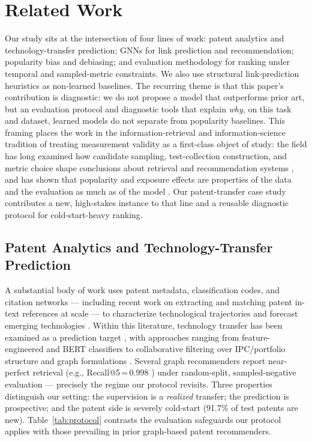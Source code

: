 \documentclass[preprint,12pt]{elsarticle}
\begin{document}
\section{Related Work}
\label{sec:related}

Our study sits at the intersection of four lines of work: patent analytics and
technology-transfer prediction; GNNs for link prediction and recommendation;
popularity bias and debiasing; and evaluation methodology for ranking under temporal
and sampled-metric constraints. We also use structural link-prediction heuristics as
non-learned baselines. The recurring theme is that this paper's contribution is diagnostic:
we do not propose a model that outperforms prior art, but an evaluation protocol and
diagnostic tools that explain \emph{why}, on this task and dataset, learned models do
not separate from popularity baselines. This framing places the work in the
information-retrieval and information-science tradition of treating measurement
validity as a first-class object of study: the field has long examined how candidate
sampling, test-collection construction, and metric choice shape conclusions about
retrieval and recommendation systems \cite{krichene2020,dacrema2019,hidasi2023}, and
has shown that popularity and exposure effects are properties of the data and the
evaluation as much as of the model \cite{boratto2021,deldjoo2021}. Our patent-transfer
case study contributes a new, high-stakes instance to that line and a reusable
diagnostic protocol for cold-start-heavy ranking.

\subsection{Patent Analytics and Technology-Transfer Prediction}
A substantial body of work uses patent metadata, classification codes, and citation
networks --- including recent work on extracting and matching patent in-text
references at scale \cite{abbasiantaeb2025} --- to characterize technological
trajectories and forecast emerging technologies \cite{krestel2021,erdi2013}. Within
this literature, technology transfer has been examined as a prediction target
\cite{kimgeum2020,rhee2026}, with approaches ranging from feature-engineered and BERT
classifiers \cite{kimgeum2020} to collaborative filtering over IPC/portfolio
structure \cite{parkyoon2017,lee2016} and graph formulations
\cite{kim2025,chendeng2023,liu2024}. Several graph recommenders report near-perfect
retrieval (e.g., Recall@5\,=\,0.998 \cite{kim2025}) under random-split, sampled-negative
evaluation --- precisely the regime our protocol revisits. Three properties
distinguish our setting: the supervision is a \emph{realized} transfer; the
prediction is prospective; and the patent side is severely cold-start (91.7\% of test
patents are new). Table~\ref{tab:protocol} contrasts the evaluation safeguards our
protocol applies with those prevailing in prior graph-based patent recommenders.
\end{document}
